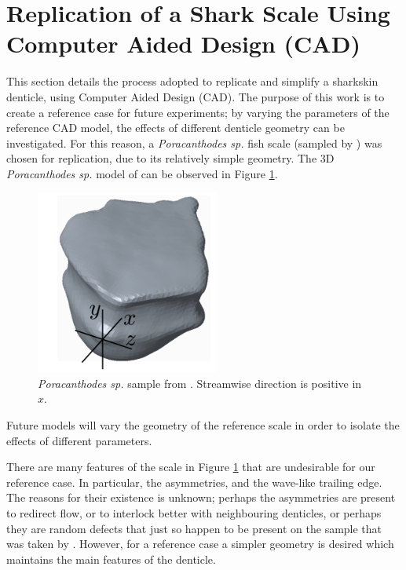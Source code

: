 \documentclass[12pt,oneside,a4paper]{article}
\begin{document}
\section{Replication of a Shark Scale Using Computer Aided Design (CAD)}
\label{section:cad}
This section details the process adopted to replicate and simplify a sharkskin denticle, using Computer Aided Design (CAD). The purpose of this work is to create a reference case for future experiments; by varying the parameters of the reference CAD model, the effects of different denticle geometry can be investigated. For this reason, a \textit{Poracanthodes sp.} fish scale (sampled by \cite{fletcher2014phd}) was chosen for replication, due to its relatively simple geometry. The 3D \textit{Poracanthodes sp.} model of \cite{fletcher2014phd} can be observed in Figure \ref{figure:cad:scaleSample}.  
%
\begin{figure}[!b]
\centering
\includegraphics[width=6cm]{images/cad/scannedScaleFletcher.png}\hfill
\caption{\textit{Poracanthodes sp.} sample from \cite{fletcher2014phd}. Streamwise direction is positive in $x$.}
\label{figure:cad:scaleSample}
\end{figure}
%
 Future models will vary the geometry of the reference scale in order to isolate the effects of different parameters. 

There are many features of the scale in Figure \ref{figure:cad:scaleSample} that are undesirable for our reference case. In particular, the asymmetries, and the wave-like trailing edge. The reasons for their existence is unknown; perhaps the asymmetries are present to redirect flow, or to interlock better with neighbouring denticles, or perhaps they are random defects that just so happen to be present on the sample that was taken by \cite{fletcher2014phd}. However, for a reference case a simpler geometry is desired which maintains the main features of the denticle.
\end{document}
